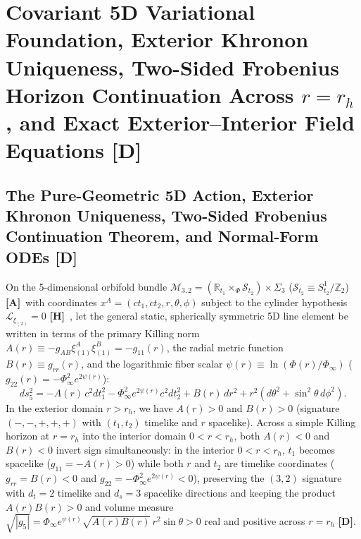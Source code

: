 \documentclass[11pt,a4paper]{article}
\newcommand{\catA}{\textbf{\textcolor{purple!80!black}{[A]}}}
\newcommand{\catD}{\textbf{\textcolor{blue!75!black}{[D]}}}
\newcommand{\catH}{\textbf{\textcolor{orange!85!black}{[H]}}}
\theoremstyle{plain}
\theoremstyle{definition}
\theoremstyle{remark}
\numberwithin{equation}{section}
\begin{document}
\section{\texorpdfstring{Covariant 5D Variational Foundation, Exterior Khronon Uniqueness, Two-Sided Frobenius Horizon Continuation Across $r = r_h$, and Exact Exterior--Interior Field Equations \catD}{Covariant 5D Variational Foundation, Exterior Khronon Uniqueness, Two-Sided Frobenius Horizon Continuation Across r = r_h, and Exact Exterior-Interior Field Equations}}

\subsection{\texorpdfstring{The Pure-Geometric 5D Action, Exterior Khronon Uniqueness, Two-Sided Frobenius Continuation Theorem, and Normal-Form ODEs \catD}{The Pure-Geometric 5D Action, Exterior Khronon Uniqueness, Two-Sided Frobenius Continuation Theorem, and Normal-Form ODEs}}

On the 5-dimensional orbifold bundle $\mathcal{M}_{3,2} = (\mathbb{R}_{t_1} \times_{\Phi} \mathcal{S}_{t_2}) \times \Sigma_3$ ($\mathcal{S}_{t_2} \equiv S^1_{t_2}/\mathbb{Z}_2$) \catA\ with coordinates $x^A = (c t_1, c t_2, r, \theta, \phi)$ subject to the cylinder hypothesis $\mathcal{L}_{\xi_{(2)}} = 0$ \catH\ \cite{jimenez2026_p0,jimenez2026a}, let the general static, spherically symmetric 5D line element be written in terms of the primary Killing norm $A(r) \equiv -g_{AB}\xi_{(1)}^A\xi_{(1)}^B = -g_{11}(r)$, the radial metric function $B(r) \equiv g_{rr}(r)$, and the logarithmic fiber scalar $\psi(r) \equiv \ln(\Phi(r)/\Phi_{\infty})$ ($g_{22}(r) = -\Phi_{\infty}^2 e^{2\psi(r)}$):
\begin{equation}
  ds_5^2 = -A(r)\,c^2 dt_1^2 - \Phi_{\infty}^2 e^{2\psi(r)} c^2 dt_2^2 + B(r)\,dr^2 + r^2\left(d\theta^2 + \sin^2\theta\,d\phi^2\right).
  \label{eq:general_static_5d_metric_p2}
\end{equation}
In the exterior domain $r > r_h$, we have $A(r) > 0$ and $B(r) > 0$ (signature $(-,-,+,+,+)$ with $(t_1, t_2)$ timelike and $r$ spacelike). Across a simple Killing horizon at $r = r_h$ into the interior domain $0 < r < r_h$, both $A(r) < 0$ and $B(r) < 0$ invert sign simultaneously: in the interior $0 < r < r_h$, $t_1$ becomes spacelike ($g_{11} = -A(r) > 0$) while both $r$ and $t_2$ are timelike coordinates ($g_{rr} = B(r) < 0$ and $g_{22} = -\Phi_{\infty}^2 e^{2\psi(r)} < 0$), preserving the $(3,2)$ signature with $d_t = 2$ timelike and $d_s = 3$ spacelike directions and keeping the product $A(r)B(r) > 0$ and volume measure $\sqrt{|g_5|} = \Phi_{\infty}e^{\psi(r)}\sqrt{A(r)B(r)}\,r^2\sin\theta > 0$ real and positive across $r = r_h$ \catD.
\end{document}
